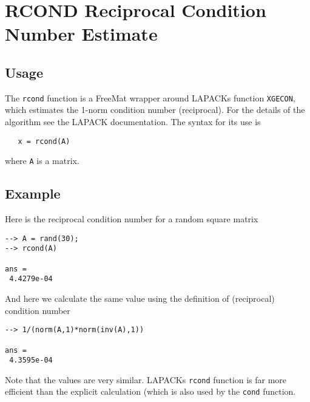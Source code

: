 \section{RCOND Reciprocal Condition Number Estimate}

\subsection{Usage}

The \verb|rcond| function is a FreeMat wrapper around LAPACKs
function \verb|XGECON|, which estimates the 1-norm condition
number (reciprocal).  For the details of the algorithm see
the LAPACK documentation.  The syntax for its use is
\begin{verbatim}
   x = rcond(A)
\end{verbatim}
where \verb|A| is a matrix.
\subsection{Example}

Here is the reciprocal condition number for a random square
matrix
\begin{verbatim}
--> A = rand(30);
--> rcond(A)

ans = 
 4.4279e-04 
\end{verbatim}
And here we calculate the same value using the definition of
(reciprocal) condition number
\begin{verbatim}
--> 1/(norm(A,1)*norm(inv(A),1))

ans = 
 4.3595e-04 
\end{verbatim}
Note that the values are very similar.  LAPACKs \verb|rcond|
function is far more efficient than the explicit calculation
(which is also used by the \verb|cond| function.
